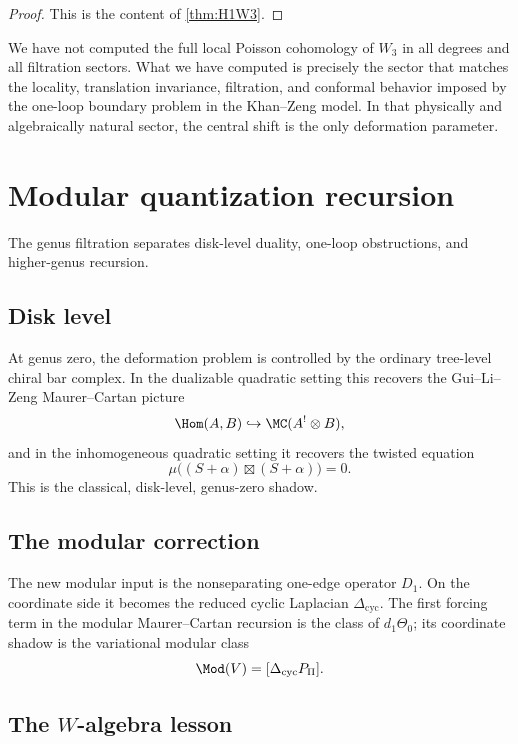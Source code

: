 \begin{proof}
This is the content of \cref{thm:H1W3}.
\end{proof}

\begin{remark}
We have not computed the full local Poisson cohomology of $W_3$ in all degrees and all
filtration sectors. What we have computed is precisely the sector that matches the locality,
translation invariance, filtration, and conformal behavior imposed by the one-loop boundary
problem in the Khan--Zeng model. In that physically and algebraically natural sector, the
central shift is the only deformation parameter.
\end{remark}

\section{Modular quantization recursion}

The genus filtration separates disk-level duality, one-loop
obstructions, and higher-genus recursion.

\subsection{Disk level}

At genus zero, the deformation problem is controlled by the ordinary tree-level chiral bar
complex. In the dualizable quadratic setting this recovers the Gui--Li--Zeng Maurer--Cartan
picture
\[
\Hom(A,B)\hookrightarrow \MC(A^!\otimes B),
\]
and in the inhomogeneous quadratic setting it recovers the twisted equation
\[
\mu\big((S+\alpha)\boxtimes(S+\alpha)\big)=0.
\]
This is the classical, disk-level, genus-zero shadow.

\subsection{The modular correction}

The new modular input is the nonseparating one-edge operator $D_1$. On the coordinate side
it becomes the reduced cyclic Laplacian $\Delta_{\mathrm{cyc}}$. The first forcing term in the
modular Maurer--Cartan recursion is the class of $d_1\Theta_0$; its coordinate shadow is the
variational modular class
\[
\Mod(V)=[\Delta_{\mathrm{cyc}}P_\Pi].
\]

\subsection{The $W$-algebra lesson}

